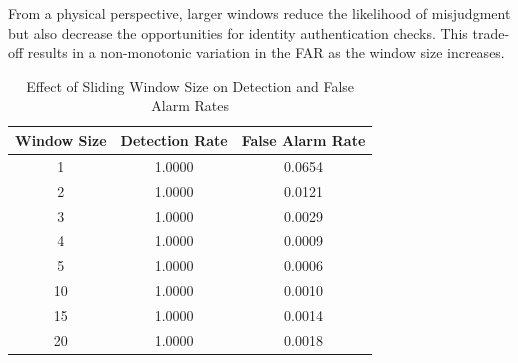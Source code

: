 \documentclass[sigconf]{acmart}
\begin{document}
From a physical perspective, larger windows reduce the likelihood of misjudgment but also decrease the opportunities for identity authentication checks. This trade-off results in a non-monotonic variation in the FAR as the window size increases.

\begin{table}[htbp]
\centering
\caption{Effect of Sliding Window Size on Detection and False Alarm Rates}
\begin{tabular}{ccc}
\toprule
\textbf{Window Size} & \textbf{Detection Rate} & \textbf{False Alarm Rate} \\
\midrule
1  & 1.0000 & 0.0654 \\
2  & 1.0000 & 0.0121 \\
3  & 1.0000 & 0.0029 \\
4  & 1.0000 & 0.0009 \\
5  & 1.0000 & 0.0006 \\
10 & 1.0000 & 0.0010 \\
15 & 1.0000 & 0.0014 \\
20 & 1.0000 & 0.0018 \\
\bottomrule
\end{tabular}
\label{tab:window-size}
\end{table}
\end{document}
